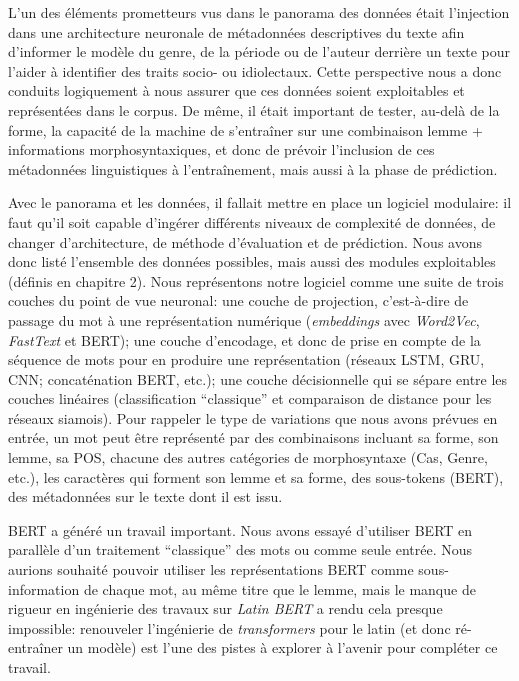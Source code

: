 L'un des éléments prometteurs vus dans le panorama des données était l'injection dans une architecture neuronale de métadonnées descriptives du texte afin d'informer le modèle du genre, de la période ou de l'auteur derrière un texte pour l'aider à identifier des traits socio- ou idiolectaux. Cette perspective nous a donc conduits logiquement à nous assurer que ces données soient exploitables et représentées dans le corpus. De même, il était important de tester, au-delà de la forme, la capacité de la machine de s'entraîner sur une combinaison lemme + informations morphosyntaxiques, et donc de prévoir l'inclusion de ces métadonnées linguistiques à l'entraînement, mais aussi à la phase de prédiction.

Avec le panorama et les données, il fallait mettre en place un logiciel modulaire: il faut qu'il soit capable d'ingérer différents niveaux de complexité de données, de changer d'architecture, de méthode d'évaluation et de prédiction. Nous avons donc listé l'ensemble des données possibles, mais aussi des modules exploitables (définis en chapitre 2). Nous représentons notre logiciel comme une suite de trois couches du point de vue neuronal: une couche de projection, c'est-à-dire de passage du mot à une représentation numérique (\textit{embeddings} avec \textit{Word2Vec}, \textit{FastText} et BERT); une couche d'encodage, et donc de prise en compte de la séquence de mots pour en produire une représentation (réseaux LSTM, GRU, CNN; concaténation BERT, etc.); une couche décisionnelle qui se sépare entre les couches linéaires (classification \enquote{classique} et comparaison de distance pour les réseaux siamois). Pour rappeler le type de variations que nous avons prévues en entrée, un mot peut être représenté par des combinaisons incluant sa forme, son lemme, sa POS, chacune des autres catégories de morphosyntaxe (Cas, Genre, etc.), les caractères qui forment son lemme et sa forme, des sous-tokens (BERT), des métadonnées sur le texte dont il est issu.

BERT a généré un travail important. Nous avons essayé d'utiliser BERT en parallèle d'un traitement \enquote{classique} des mots ou comme seule entrée. Nous aurions souhaité pouvoir utiliser les représentations BERT comme sous-information de chaque mot, au même titre que le lemme, mais le manque de rigueur en ingénierie des travaux sur \textit{Latin BERT} a rendu cela presque impossible: renouveler l'ingénierie de \textit{transformers} pour le latin (et donc ré-entraîner un modèle) est l'une des pistes à explorer à l'avenir pour compléter ce travail.

